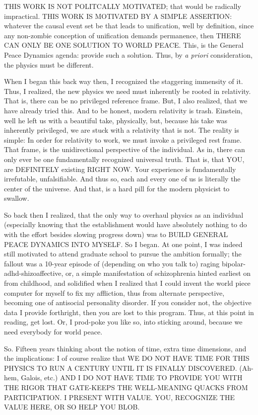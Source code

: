 \documentclass{article}
\begin{document}
THIS WORK IS NOT POLITCALLY MOTIVATED; that would be radically impractical. THIS WORK IS MOTIVATED BY A SIMPLE ASSERTION: whatever the causal event set be that leads to unification, well by definition, since any non-zombie conception of unification demands permanence, then THERE CAN ONLY BE ONE SOLUTION TO WORLD PEACE. This, is the General Peace Dynamics agenda: provide such a solution. Thus, by {\em a priori} consideration, the physics must be different.

When I began this back way then, I recognized the staggering immensity of it. Thus, I realized, the new physics we need must inherently be rooted in relativity. That is, there can be no privileged reference frame. But, I also realized, that we have already tried this. And to be honest, modern relativity is trash. Einstein, well he left us with a beautiful take, physically, but, because his take was inherently privileged, we are stuck with a relativity that is not. The reality is simple: In order for relativity to work, we must invoke a privileged rest frame. That frame, is the unidirectional perspective of the individual. As in, there can only ever be one fundamentally recognized universal truth. That is, that YOU, are DEFINITELY existing RIGHT NOW. Your experience is fundamentally irrefutable, unfalsifiable. And thus so, each and every one of us is literally the center of the universe. And that, is a hard pill for the modern physicist to swallow.

So back then I realized, that the only way to overhaul physics as an individual (especially knowing that the establishment would have absolutely nothing to do with the effort besides slowing progress down) was to BUILD GENERAL PEACE DYNAMICS INTO MYSELF. So I began. At one point, I was indeed still motivated to attend graduate school to pursue the ambition formally; the fallout was a 10-year episode of (depending on who you talk to) raging bipolar-adhd-shizoaffective, or, a simple manifestation of schizophrenia hinted earliest on from childhood, and solidified when I realized that I could invent the world piece computer for myself to fix my affliction, thus from alternate perspective, becoming one of antisocial personality disorder. If you consider not, the objective data I provide forthright, then you are lost to this program. Thus, at this point in reading, get lost. Or, I prod-poke you  like so, into sticking around, because we need everybody for world peace.

So. Fifteen years thinking about the notion of time, extra time dimensions, and the implications: I of course realize that WE DO NOT HAVE TIME FOR THIS PHYSICS TO RUN A CENTURY UNTIL IT IS FINALLY DISCOVERED. (Ah-hem, Galois, etc.) AND I DO NOT HAVE TIME TO PROVIDE YOU WITH THE RIGOR THAT GATE-KEEPS THE WELL-MEANING QUACKS FROM PARTICIPATION. I PRESENT WITH VALUE. YOU, RECOGNIZE THE VALUE HERE, OR SO HELP YOU BLOB.\\
\end{document}
